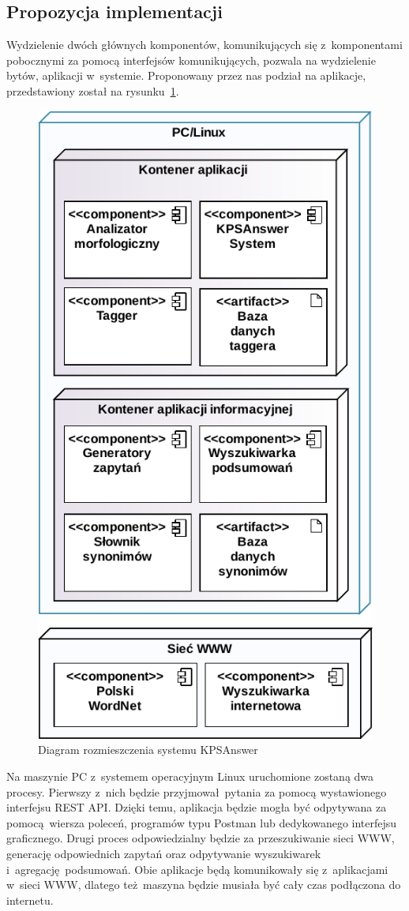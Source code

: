\subsection{Propozycja implementacji}
Wydzielenie dwóch głównych komponentów, komunikujących się z~komponentami pobocznymi za pomocą interfejsów komunikujących, pozwala na wydzielenie bytów, aplikacji w~systemie. Proponowany przez nas podział na aplikacje, przedstawiony został na rysunku~\ref{fig:system-deployment}.

\begin{figure}[h!]
    \centering
    \includegraphics[width=0.8\columnwidth]{figures/WEDT-Deployment.pdf}
    \caption{Diagram rozmieszczenia systemu KPSAnswer}
    \label{fig:system-deployment}
\end{figure}

Na maszynie PC z~systemem operacyjnym Linux uruchomione zostaną dwa procesy. Pierwszy z~nich będzie przyjmował pytania za pomocą wystawionego interfejsu REST API. Dzięki temu, aplikacja będzie mogła być odpytywana za pomocą wiersza poleceń, programów typu Postman lub dedykowanego interfejsu graficznego. Drugi proces odpowiedzialny będzie za przeszukiwanie sieci WWW, generację odpowiednich zapytań oraz odpytywanie wyszukiwarek i~agregację podsumowań. Obie aplikacje będą komunikowały się z~aplikacjami w~sieci WWW, dlatego też maszyna będzie musiała być cały czas podłączona do internetu.  